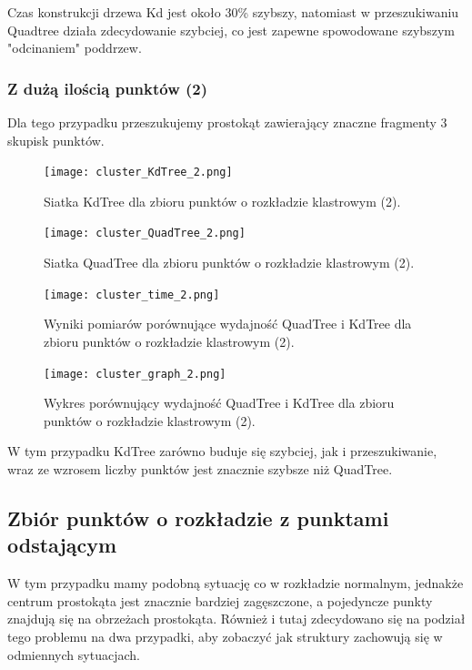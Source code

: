 \documentclass{lab}
\begin{document}
Czas konstrukcji drzewa Kd jest około 30\% szybszy, natomiast w przeszukiwaniu Quadtree działa zdecydowanie szybciej, co jest zapewne spowodowane szybszym "odcinaniem" poddrzew.

\subsubsection{Z dużą ilością punktów (2)}
Dla tego przypadku przeszukujemy prostokąt zawierający znaczne fragmenty 3 skupisk punktów.

\begin{figure}[H]
  \centering
  \texttt{[image: cluster\_KdTree\_2.png]}
  \caption{Siatka KdTree dla zbioru punktów o rozkładzie klastrowym (2).}
  \label{fig:cluster_KdTree_2}
\end{figure}

\begin{figure}[H]
  \centering
  \texttt{[image: cluster\_QuadTree\_2.png]}
  \caption{Siatka QuadTree dla zbioru punktów o rozkładzie klastrowym (2).}
  \label{fig:cluster_QuadTree_2}
\end{figure}

\begin{figure}[H]
  \centering
  \texttt{[image: cluster\_time\_2.png]}
  \caption{Wyniki pomiarów porównujące wydajność QuadTree i KdTree dla zbioru punktów o rozkładzie klastrowym (2).}
  \label{fig:cluster_time_2}
\end{figure}

\begin{figure}[H]
  \centering
  \texttt{[image: cluster\_graph\_2.png]}
  \caption{Wykres porównujący wydajność QuadTree i KdTree dla zbioru punktów o rozkładzie klastrowym (2).}
  \label{fig:cluster_graph_2}
\end{figure}

W tym przypadku KdTree zarówno buduje się szybciej, jak i przeszukiwanie, wraz ze wzrosem liczby punktów jest znacznie szybsze niż QuadTree.

\subsection{Zbiór punktów o rozkładzie z punktami odstającym}
W tym przypadku mamy podobną sytuację co w rozkładzie normalnym, jednakże centrum prostokąta jest znacznie bardziej zagęszczone, a pojedyncze punkty znajdują się na obrzeżach prostokąta.
Również i tutaj zdecydowano się na podział tego problemu na dwa przypadki, aby zobaczyć jak struktury zachowują się w odmiennych sytuacjach.
\end{document}
